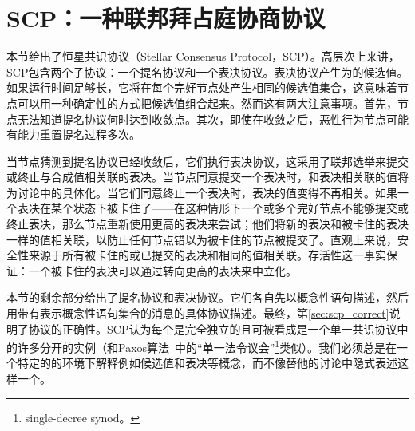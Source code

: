 \section{SCP：一种联邦拜占庭协商协议}\label{sec:scp}

本节给出了恒星共识协议（Stellar Consensus Protocol，SCP）。高层次上来讲，SCP包含两个子协议：一个提名协议和一个表决协议。表决协议产生为{\slot}的候选值。如果运行时间足够长，它将在每个完好节点处产生相同的候选值集合，这意味着节点可以用一种确定性的方式把候选值组合起来。然而这有两大注意事项。首先，节点无法知道提名协议何时达到收敛点。其次，即使在收敛之后，恶性行为节点可能有能力重置提名过程多次。

当节点猜测到提名协议已经收敛后，它们执行表决协议，这采用了联邦选举来提交或终止与合成值相关联的表决。当节点同意提交一个表决时，和表决相关联的值将为讨论中的{\slot}具体化。当它们同意终止一个表决时，表决的值变得不再相关。如果一个表决在某个状态下被卡住了——在这种情形下一个或多个完好节点不能够提交或终止表决，那么节点重新使用更高的表决来尝试；他们将新的表决和被卡住的表决一样的值相关联，以防止任何节点错以为被卡住的节点被提交了。直观上来说，安全性来源于所有被卡住的或已提交的表决和相同的值相关联。存活性这一事实保证：一个被卡住的表决可以通过转向更高的表决来中立化。

本节的剩余部分给出了提名协议和表决协议。它们各自先以概念性语句描述，然后用带有表示概念性语句集合的消息的具体协议描述。最终，第\ref{sec:scp_correct}说明了协议的正确性。SCP认为每个{\slot}是完全独立的且可被看成是一个单一{\slot}共识协议中的许多分开的实例（和Paxos算法~\cite{Lamport:1998:PP:279227.279229}中的``单一法令议会''\footnote{single-decree synod。}类似）。我们必须总是在一个特定的{\slot}的环境下解释例如候选值和表决等概念，而不像替他的讨论中隐式表述这样一个{\slot}。



